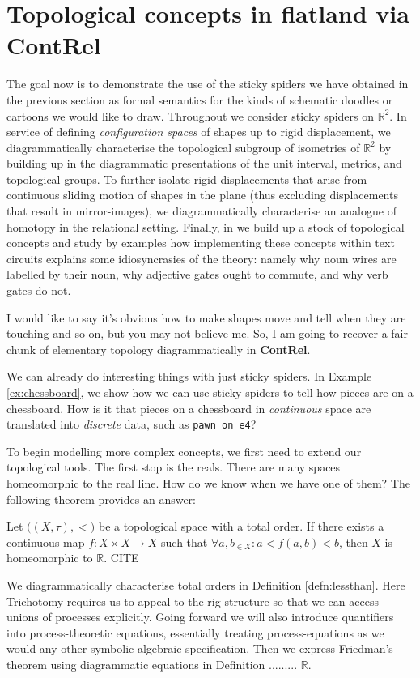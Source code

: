 \section{Topological concepts in flatland via \textbf{ContRel}}\label{sec:concepts}

The goal now is to demonstrate the use of the sticky spiders we have obtained in the previous section as formal semantics for the kinds of schematic doodles or cartoons we would like to draw. Throughout we consider sticky spiders on $\mathbb{R}^2$. In service of defining \emph{configuration spaces} of shapes up to rigid displacement, we diagrammatically characterise the topological subgroup of isometries of $\mathbb{R}^2$ by building up in the diagrammatic presentations of the unit interval, metrics, and topological groups. To further isolate rigid displacements that arise from continuous sliding motion of shapes in the plane (thus excluding displacements that result in mirror-images), we diagrammatically characterise an analogue of homotopy in the relational setting. Finally, in we build up a stock of topological concepts and study by examples how implementing these concepts within text circuits explains some idiosyncrasies of the theory: namely why noun wires are labelled by their noun, why adjective gates ought to commute, and why verb gates do not.

 I would like to say it's obvious how to make shapes move and tell when they are touching and so on, but you may not believe me. So, I am going to recover a fair chunk of elementary topology diagrammatically in \textbf{ContRel}.

 We can already do interesting things with just sticky spiders. In Example \ref{ex:chessboard}, we show how we can use sticky spiders to tell how pieces are on a chessboard. How is it that pieces on a chessboard in \emph{continuous} space are translated into \emph{discrete} data, such as \texttt{pawn on e4}?

To begin modelling more complex concepts, we first need to extend our topological tools. The first stop is the reals. There are many spaces homeomorphic to the real line. How do we know when we have one of them? The following theorem provides an answer:
\begin{theorem}[Friedman]\label{thm:Friedman}
Let $\big((X,\tau), < \big)$ be a topological space with a total order. If there exists a continuous map $f: X \times X \rightarrow X$ such that $\forall a,b_{\in X} : a < f(a,b) < b$, then $X$ is homeomorphic to $\mathbb{R}$.
\bR CITE \e
\end{theorem}
We diagrammatically characterise total orders in Definition \ref{defn:lessthan}. Here Trichotomy requires us to appeal to the rig structure so that we can access unions of processes explicitly. Going forward we will also introduce quantifiers into process-theoretic equations, essentially treating process-equations as we would any other symbolic algebraic specification. Then we express Friedman's theorem using diagrammatic equations in Definition ......... $\mathbb{R}$.

